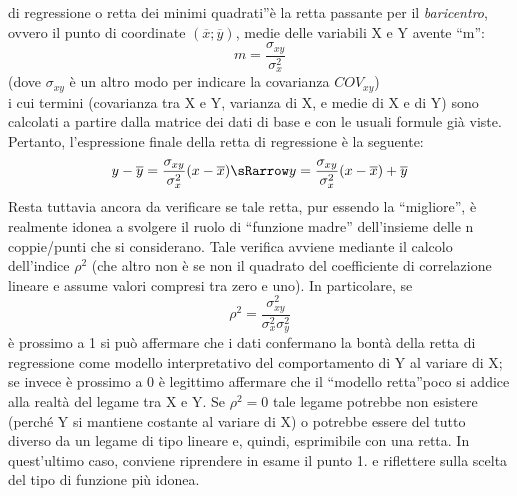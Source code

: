 di regressione  o retta dei minimi quadrati\textquotedblright è la retta 
passante per il \emph{baricentro}, ovvero il punto di coordinate 
\((\overline{x};\overline{y})\), medie delle variabili X e Y avente 
\textquotedblleft m\textquotedblright:
 \[m=\frac{\sigma_{xy}}{\sigma^2_{x}}\]
 (dove \(\sigma_{xy}\) è un altro modo per indicare la covarianza 
\(COV_{xy}\))\\
 i cui termini (covarianza tra X e Y, varianza di X, e medie di X e di Y) 
sono calcolati a partire dalla matrice dei dati di base e con le usuali 
formule già viste.
 Pertanto, l'espressione finale della retta di regressione è la seguente:
\[y-\overline{y}=\frac{\sigma_{xy}}{\sigma^2_{x}}(x-\overline{x})
  \sRarrow
  y=\frac{\sigma_{xy}}{\sigma^2_{x}}(x-\overline{x})+\overline{y}\]
 Resta tuttavia ancora da verificare se tale retta, pur essendo la 
\textquotedblleft migliore\textquotedblright,  è realmente idonea a 
svolgere il ruolo di \textquotedblleft funzione madre\textquotedblright 
dell'insieme delle n coppie/punti che si considerano. Tale verifica avviene 
mediante il calcolo dell'indice \(\rho^2\) (che altro non è se non il 
quadrato del coefficiente di correlazione lineare e assume valori compresi 
tra zero e uno).
 In particolare,  se
 \[\rho^2=\frac{\sigma^2_{xy}}{\sigma^2_{x}\sigma^2_{y}}\]
 è prossimo a 1 si può affermare che i dati confermano la bontà della  
retta di regressione  come modello interpretativo del comportamento di Y al 
variare di X; se invece è prossimo a 0 è legittimo affermare che il 
\textquotedblleft modello retta\textquotedblright poco si addice alla 
realtà del legame tra X e Y.  Se \(\rho^2=0\) tale legame potrebbe non 
esistere (perché Y si mantiene costante al variare di X) o potrebbe essere 
del tutto diverso da un legame di tipo lineare e, quindi, esprimibile con 
una retta. In quest'ultimo caso, conviene riprendere in esame il punto 1. e 
riflettere sulla scelta del tipo di funzione più idonea.
